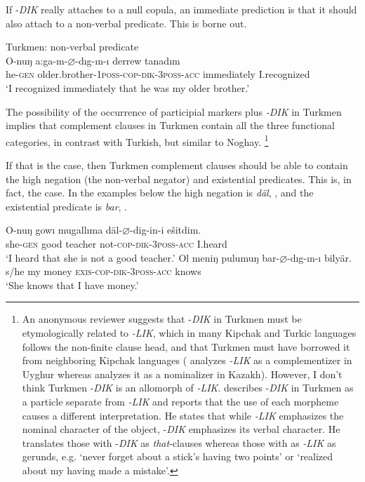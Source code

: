 \documentclass[output=paper]{langsci/langscibook}
\begin{document}
\begin{sloppypar}If -\textit{DIK} really attaches to a null copula, an immediate prediction is that it should also attach to a non-verbal predicate. 
This is borne out.\end{sloppypar}

\ea Turkmen: non-verbal predicate \\%
    \label{kelepirex:key:24}
    \gll O-nuŋ a:ga-m-$\varnothing$-dıg-ın-ı derrew tanadım\\
    he-\textsc{gen}  older.brother-1\textsc{poss}-\textsc{cop}{}-\textsc{dik}{}-\textsc{3poss-acc} immediately I.recognized\\
    \glt `I recognized immediately that he was my older brother.'
\z

The possibility of the occurrence of participial markers plus \textit{-DIK} in Turkmen implies that complement clauses in Turkmen contain all the three functional categories, in contrast with Turkish, but similar to Noghay.%
    \footnote{%
        An anonymous reviewer suggests that -\textit{DIK} in Turkmen must be etymologically related to \mbox{\textit{-LIK}}, which in many Kipchak and Turkic languages follows the non-finite clause head, and that Turkmen must have borrowed it from neighboring Kipchak languages 
        (\citet{Asarina2011} analyzes \textit{-LIK} as a complementizer in Uyghur whereas \citet{OtottKovacs2018} analyzes it as a nominalizer in Kazakh).
        However, I don't think Turkmen -\textit{DIK} is an allomorph of \textit{{}-LIK}.
        \citet[480--483]{Clark1998} describes -\textit{DIK} in Turkmen as a particle separate from \textit{{}-LIK} and reports that the use of each morpheme causes a different interpretation. 
        He states that while \textit{{}-LIK} emphasizes the nominal character of the object, -\textit{DIK} emphasizes its verbal character. 
        He translates those with -\textit{DIK} as \textit{that}{}-clauses whereas those with as \textit{{}-LIK} as gerunds, 
        e.g. `never forget about a stick's having two points' or `realized about my having made a mistake'.
    } 

If that is the case, then Turkmen complement clauses should be able to contain the high negation (the non-verbal negator) and existential predicates. 
This is, in fact, the case. 
In the examples below the high negation is \textit{däl}, , and the existential predicate is \textit{bar}, .

\ea%
    \label{kelepirex:key:25}
    \gll O-nuŋ gowı mugallıma däl-$\varnothing$-dig-in-i ešitdim. \\
    she-\textsc{gen} good teacher       not-\textsc{cop}{}-\textsc{dik{}-3poss-acc} I.heard \\
    \glt `I heard that she is not a good teacher.'
\ex %
    \label{kelepirex:key:26}
    \gll Ol meniŋ pulumuŋ bar-$\varnothing$-dıg-ın-ı bilyär. \\
    s/he my       money    \textsc{exis}{}-\textsc{cop}{}-\textsc{dik{}-3poss-acc}  knows\\
    \glt `She knows that I have money.'
\z
\end{document}
